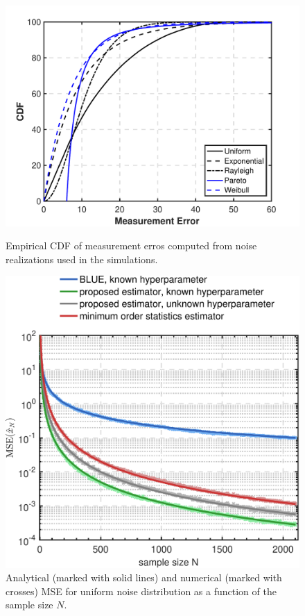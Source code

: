 \documentclass{article}
\begin{document}
\begin{figure}[t]
\begin{minipage}[t]{0.47\linewidth}
		\includegraphics[width=1.14\linewidth]{cdf_error.pdf}
		\caption{Empirical CDF of measurement erros computed from noise realizations used in the simulations.}
		\label{fig:cdf_error}
	\end{minipage}%
	\hfill%
	\begin{minipage}[t]{0.47\linewidth}
		\includegraphics[width=\linewidth]{estimationMse_unif.pdf}
		\caption{Analytical (marked with solid lines) and numerical (marked with crosses) MSE for uniform noise distribution as a function of the sample size $N$.}		
		\label{fig:uniform_blue_mvu}
	\end{minipage} 
\end{figure}
\end{document}
